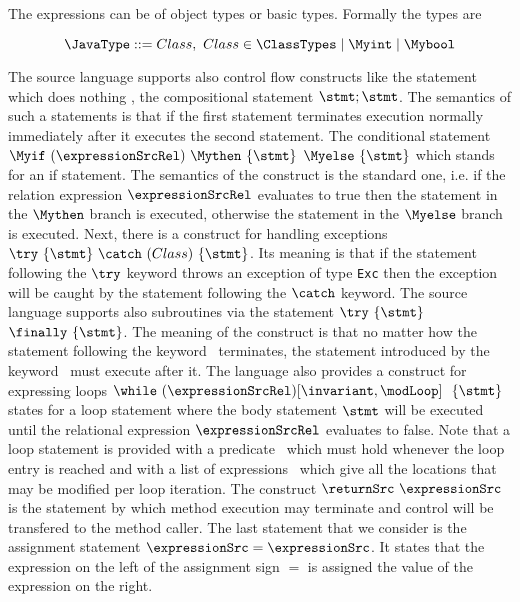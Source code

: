     The expressions can be of object types or basic types. Formally the types are 

    $$
\JavaType ::= Class, \ Class \in \ClassTypes \mid \Myint \mid \Mybool
$$ 





  The source language supports also control flow constructs like  the statement which does nothing \Myskip, the  compositional statement
  $\stmt;\stmt$. The semantics of such a statements is  that if the first statement terminates execution normally
  immediately after it executes the second statement. The conditional statement
  $\Myif \ (\expressionSrcRel) \ \Mythen \ \{ \stmt \} $ $  \Myelse \ \{ \stmt \}  $ which stands for
  an if statement.%
   The semantics of the construct is the standard one, i.e. if the relation expression $\expressionSrcRel$ 
  evaluates to true then the statement in the $ \Mythen$ branch is executed, otherwise the statement in the
  $\Myelse$ branch is executed. Next, there is a construct for handling exceptions $ \try  \ \{ \stmt \}  \ \catch \ ( Class  )\ \{ \stmt \}  $.
  Its meaning is that if the statement following the $ \try $ keyword throws an exception of type \texttt{Exc} then
  the exception will be caught by the statement following the  $ \catch $ keyword. The source language supports also 
  subroutines via the statement $ \try  \ \{ \stmt \}  $ $ \finally \ \{ \stmt \}$.  The meaning of the construct is that  
  no matter how the statement following the keyword \try \ terminates,
  the statement introduced by the keyword \finally \ must execute after it. The language also provides a construct for expressing loops 
   $ \while \ (\expressionSrcRel) \lbrack \invariant, \modLoop \rbrack \ \do \ \{ \stmt \} $ states for a loop statement where the body 
   statement $ \stmt$ will be executed until the relational expression  $\expressionSrcRel$ evaluates to false.
   Note that a loop statement is provided with a predicate \invariant \ which must hold whenever the loop entry is reached and with a list of expressions
   \modLoop \ which give all the locations that  may be modified per loop iteration. The construct $ \returnSrc \  \expressionSrc $ is
   the statement by which method execution may terminate and control will be transfered to the method caller.
   The last statement that we consider is the assignment statement $ \expressionSrc = \expressionSrc$.
    It states that the expression on the left of the assignment sign $=$ is assigned the value of the expression on the right.

